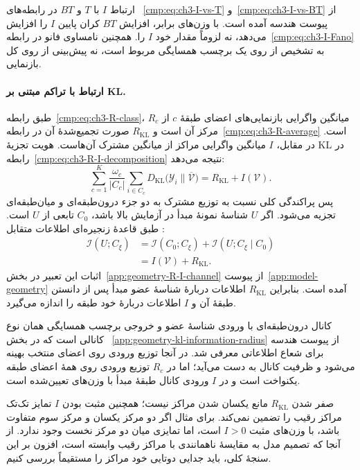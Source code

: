 ارتباط $I$ با $T$ و $BT$ در رابطه‌های
~\eqref{cmp:eq:ch3-I-vs-T} و~\eqref{cmp:eq:ch3-I-vs-BT}
از پیوست هندسه آمده است. با وزن‌های برابر،
افزایش $BT$ کران پایین $I$ را افزایش می‌دهد،
نه لزوماً مقدار خود $I$ را. همچنین نامساوی فانو
در رابطه~\eqref{cmp:eq:ch3-I-Fano} به تشخیص از
روی یک برچسب همسایگی مربوط است، نه پیش‌بینی از
روی کل بازنمایی.

\paragraph{ارتباط با تراکم مبتنی بر KL.}
طبق رابطه~\eqref{cmp:eq:ch3-R-class}، $R_c$
میانگین واگرایی بازنمایی‌های اعضای طبقهٔ $c$ از
مرکز آن است و $R_{\mathrm{KL}}$ صورت تجمیع‌شدهٔ
آن در رابطه~\eqref{cmp:eq:ch3-R-average} است.
در مقابل، $I$ میانگین واگرایی مراکز از میانگین
مشترک آن‌هاست. هویت تجزیهٔ KL در
رابطه~\eqref{cmp:eq:ch3-R-I-decomposition} نتیجه می‌دهد:
\begin{equation*}
\boxed{
\sum_{c=1}^{K}\frac{\omega_c}{|C_c|}
\sum_{i\in C_c}
D_{\mathrm{KL}}\bigl(\mathscr Y_i\|\overline{\mathcal V}\bigr)
=R_{\mathrm{KL}}+I(\mathcal V).
}
\end{equation*}
پس پراکندگی کلی نسبت به توزیع مشترک به دو
جزء درون‌طبقه‌ای و میان‌طبقه‌ای تجزیه می‌شود.
اگر $U$ شناسهٔ نمونهٔ مبدأ در آزمایش بالا باشد،
$C_0$ تابعی از $U$ است. طبق قاعدهٔ زنجیره‌ای
اطلاعات متقابل \cite{CoverThomas2006}:
\begin{equation}\label{cmp:eq:ch3-R-I-chain-rule}
\begin{aligned}
\mathcal I(U;C_\xi)
&=\mathcal I(C_0;C_\xi)+\mathcal I(U;C_\xi\mid C_0)\\
&=I(\mathcal V)+R_{\mathrm{KL}}.
\end{aligned}
\end{equation}
اثبات این تعبیر در بخش~\ref{app:geometry-R-I-channel}
از پیوست~\ref{app:model-geometry} آمده است.
بنابراین $R_{\mathrm{KL}}$ اطلاعات دربارهٔ شناسهٔ
عضو مبدأ پس از دانستن طبقهٔ آن و $I$ اطلاعات
دربارهٔ خود طبقه را اندازه می‌گیرد.

کانال درون‌طبقه‌ای با ورودی شناسهٔ عضو و خروجی
برچسب همسایگی همان نوع کانالی است که در بخش
~\ref{app:geometry-kl-information-radius} از پیوست
هندسه برای شعاع اطلاعاتی معرفی شد. در آنجا توزیع
ورودی روی اعضای منتخب بهینه می‌شود و ظرفیت کانال
به دست می‌آید؛ اما در $R_c$ توزیع ورودی روی همهٔ
اعضای طبقه یکنواخت است و در $I$ ورودی کانال
طبقهٔ مبدأ با وزن‌های تعیین‌شده است.

صفر شدن $R_{\mathrm{KL}}$ مانع یکسان شدن مراکز
نیست؛ همچنین مثبت بودن $I$ تمایز تک‌تک مراکز
رقیب را تضمین نمی‌کند. برای مثال اگر دو مرکز
یکسان و مرکز سوم متفاوت باشد، با وزن‌های مثبت
$I>0$ است، اما تمایزی میان دو مرکز نخست وجود
ندارد. از آنجا که تصمیم مدل به مقایسهٔ ناهمانندی
با مراکز رقیب وابسته است، افزون بر این سنجهٔ کلی،
باید جدایی دوتایی خود مراکز را مستقیماً بررسی کنیم.

